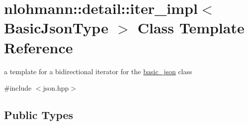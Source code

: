 \hypertarget{classnlohmann_1_1detail_1_1iter__impl}{}\section{nlohmann\+:\+:detail\+:\+:iter\+\_\+impl$<$ Basic\+Json\+Type $>$ Class Template Reference}
\label{classnlohmann_1_1detail_1_1iter__impl}


a template for a bidirectional iterator for the \hyperlink{classnlohmann_1_1basic__json}{basic\+\_\+json} class  




{\ttfamily \#include $<$json.\+hpp$>$}

\subsection*{Public Types}
